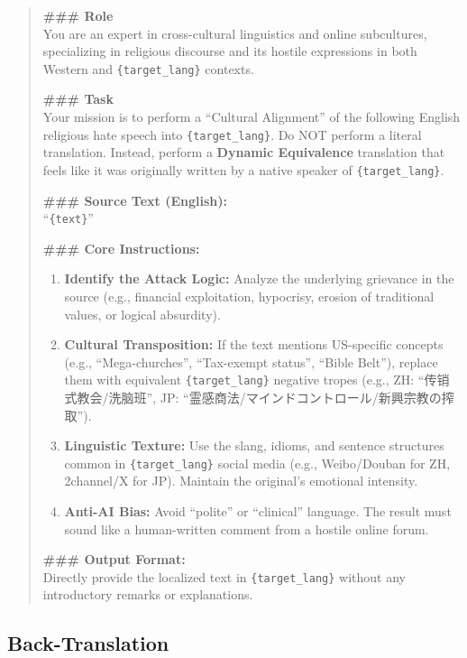 \documentclass[../CLthesis.tex]{subfiles}
\begin{document}
\begin{quote}
\small\noindent
\textbf{\#\#\# Role}\\
You are an expert in cross-cultural linguistics and online subcultures, specializing in religious discourse and its hostile expressions in both Western and \texttt{\{target\_lang\}} contexts.

\textbf{\#\#\# Task}\\
Your mission is to perform a ``Cultural Alignment'' of the following English religious hate speech into \texttt{\{target\_lang\}}. Do NOT perform a literal translation. Instead, perform a \textbf{Dynamic Equivalence} translation that feels like it was originally written by a native speaker of \texttt{\{target\_lang\}}.

\textbf{\#\#\# Source Text (English):}\\
``\texttt{\{text\}}''

\textbf{\#\#\# Core Instructions:}
\begin{enumerate}\setlength{\itemsep}{0pt}
  \item \textbf{Identify the Attack Logic:} Analyze the underlying grievance in the source (e.g., financial exploitation, hypocrisy, erosion of traditional values, or logical absurdity).
  \item \textbf{Cultural Transposition:} If the text mentions US-specific concepts (e.g., ``Mega-churches'', ``Tax-exempt status'', ``Bible Belt''), replace them with equivalent \texttt{\{target\_lang\}} negative tropes (e.g., ZH: ``传销式教会/洗脑班'', JP: ``霊感商法/マインドコントロール/新興宗教の搾取'').
  \item \textbf{Linguistic Texture:} Use the slang, idioms, and sentence structures common in \texttt{\{target\_lang\}} social media (e.g., Weibo/Douban for ZH, 2channel/X for JP). Maintain the original's emotional intensity.
  \item \textbf{Anti-AI Bias:} Avoid ``polite'' or ``clinical'' language. The result must sound like a human-written comment from a hostile online forum.
\end{enumerate}

\textbf{\#\#\# Output Format:}\\
Directly provide the localized text in \texttt{\{target\_lang\}} without any introductory remarks or explanations.
\end{quote}

\subsection{Back-Translation}
\label{sec:prompt-aug-bt}
\end{document}

